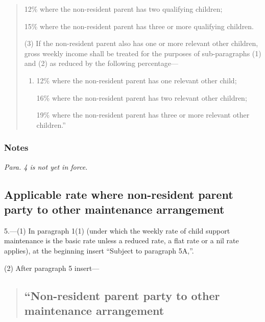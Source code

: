 \documentclass[a4paper]{article}
\newcommand\amendment[1]{\subsubsection*{Notes}{\itshape\frenchspacing\footnotesize #1 \par}}
\begin{document}
{\begin{quotation}
\begin{enumerate}
12\% where the non-resident parent has two qualifying children;

15\% where the non-resident parent has three or more qualifying children.
\end{enumerate}

(3) If the non-resident parent also has one or more relevant other children, gross weekly income shall be treated for the purposes of sub-paragraphs (1) and (2) as reduced by the following percentage—
\begin{enumerate}\item[]
12\% where the non-resident parent has one relevant other child;

16\% where the non-resident parent has two relevant other children;

19\% where the non-resident parent has three or more relevant other children.”
\end{enumerate}
\end{quotation}

%
%
%

\amendment{
Para. 4 is not yet in force.
}

\subsection*{Applicable rate where non-resident parent party to other maintenance arrangement}

5.---(1) In paragraph 1(1) (under which the weekly rate of child support maintenance is the basic rate unless a reduced rate, a flat rate or a nil rate applies), at the beginning insert “Subject to paragraph 5A,”.

(2) After paragraph 5 insert—
\begin{quotation}
\subsection*{“Non-resident parent party to other maintenance arrangement}


\end{quotation}}
\end{document}
